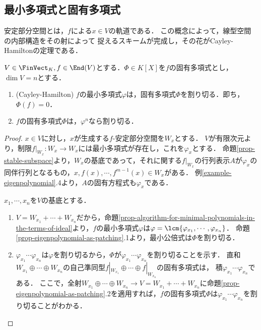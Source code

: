 \documentclass[uplatex, dvipdfmx]{jsreport}
\begin{document}
\subsection{最小多項式と固有多項式}

\begin{tcolorbox}[colframe=ForestGreen, colback=ForestGreen!10!white, breakable]
    安定部分空間とは，$f$による$x\in V$の軌道である．
    この概念によって，線型空間の内部構造をその射によって
    捉えるスキームが完成し，その花がCayley-Hamiltonの定理である．
\end{tcolorbox}

\begin{theorem}\label{thm-Cayley-Hamilton}
    $V\in\FinVect_K,f\in\End(V)$とする．$\Phi\in K[X]$を$f$の固有多項式とし，$\dim V=n$とする．
    \begin{enumerate}
        \item (Cayley-Hamilton) $f$の最小多項式$\varphi$は，固有多項式$\Phi$を割り切る．即ち，$\Phi(f)=0$．
        \item $f$の固有多項式$\Phi$は，$\varphi^n$なら割り切る．
    \end{enumerate}
\end{theorem}
\begin{proof}
    $x\in V$に対し，$x$が生成する$f$-安定部分空間を$W_x$とする．
        $V$が有限次元より，制限$f|_{W_x}:W_x\to W_x$には最小多項式が存在し，これを$\varphi_x$とする．
        命題\ref{prop-stable-subspace}より，$W_x$の基底であって，それに関する$f|_{W_x}$の行列表示$A$が$\varphi_x$の同伴行列となるもの，$x,f(x),\cdots,f^{m-1}(x)\in W_x$がある．
        例\ref{example-eigenpolynomial}.4より，$A$の固有方程式も$\varphi_x$である．

        $x_1,\cdots,x_n$を$V$の基底とする．
    \begin{enumerate}
        \item $V=W_{x_1}+\cdots+W_{x_n}$だから，命題\ref{prop-algorithm-for-minimal-polynomials-in-the-terms-of-ideal}より，$f$の最小多項式$\varphi$は$\varphi=\lcm\{\varphi_{x_1},\cdots,\varphi_{x_n}\}$．
        命題\ref{prop-eigenpolynomial-as-patching}.1より，最小公倍式は$\Phi$を割り切る．
        \item $\varphi_{x_1}\cdots\varphi_{x_n}$は$\varphi$を割り切るから，$\Phi$が$\varphi_{x_1}\cdots\varphi_{x_n}$を割り切ることを示す．
        直和$W_{x_1}\oplus\cdots\oplus W_{x_n}$の自己準同型$f|_{W_{x_1}}\oplus\cdots\oplus f|_{W_{x_n}}$の固有多項式は，
        積$\varphi_{x_1}\cdots\varphi_{x_n}$である．
        ここで，全射$W_{x_1}\oplus\cdots\oplus W_{x_n}\to V=W_{x_1}+\cdots+W_{x_n}$に命題\ref{prop-eigenpolynomial-as-patching}.2を適用すれば，$f$の固有多項式$\Phi$は$\varphi_{x_1}\cdots\varphi_{x_n}$を割り切ることがわかる．
    \end{enumerate}
\end{proof}
\end{document}
